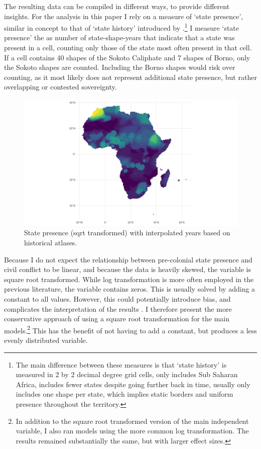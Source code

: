\documentclass[12pt]{article}
\begin{document}
The resulting data can be compiled in different ways, to provide different
insights. For the analysis in this paper I rely on a measure of `state
presence', similar in concept to that of `state history' introduced by
\citet{Depetris-Chauvin2016}.\footnote{The main difference between these
	measures is that `state history' is measured in 2 by 2 decimal degree
	grid cells, only includes Sub Saharan Africa, includes fewer states
	despite going further back in time, usually only includes one shape per
state, which implies static borders and uniform presence throughout the
territory.} I measure `state presence' the as number of state-shape-years that
indicate that a state was present in a cell, counting only those of the state
most often present in that cell. If a cell contains 40 shapes of the Sokoto
Caliphate and 7 shapes of Borno, only the Sokoto shapes are counted. Including
the Borno shapes would risk over counting, as it most likely does not represent
additional state presence, but rather overlapping or contested sovereignty.


\begin{figure}[htpb]
	\centering
	\includegraphics[width=\linewidth]{../R/Output/sqrtSpAll.pdf}
	\caption{State presence (sqrt transformed) with interpolated years based
	on historical atlases.}
	\label{Sp_i}
\end{figure}


Because I do not expect the relationship between pre-colonial state presence and
civil conflict to be linear, and because the data is heavily skewed, the
variable is square root transformed. While log transformation is more often
employed in the previous literature, the variable contains zeros. This is
usually solved by adding a constant to all values. However, this could
potentially introduce bias, and complicates the interpretation of the results
\citep{Ekwaru_2018}. I therefore present the more conservative approach of using
a square root transformation for the main models.\footnote{In addition to the
	square root transformed version of the main independent variable, I also
	ran models using the more common log transformation. The results
remained substantially the same, but with larger effect sizes.} This has the
benefit of not having to add a constant, but produces a less evenly distributed
variable. 
\end{document}
